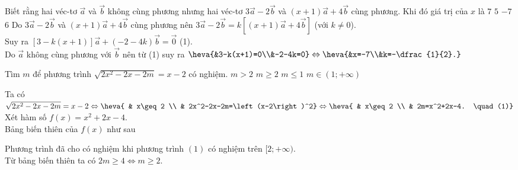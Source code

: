 \begin{ex}%
Biết rằng hai véc-tơ $\overrightarrow{a}$ và $\overrightarrow{b}$ không cùng phương nhưng hai véc-tơ $3\overrightarrow{a}-2\overrightarrow{b}$ và $(x+1)\overrightarrow{a}+4\overrightarrow{b}$ cùng phương. Khi đó giá trị của $x$ là
\choice
{$7$}
{$5$}
{\True $-7$}
{$6$}
\loigiai
{Do $3\overrightarrow{a}-2\overrightarrow{b}$ và $(x+1)\overrightarrow{a}+4\overrightarrow{b}$ cùng phương nên $3\overrightarrow{a}-2\overrightarrow{b}=k[(x+1)\overrightarrow{a}+4\overrightarrow{b}]$ (với $k\ne0$).\\
Suy ra $[3-k(x+1)]\overrightarrow{a}+(-2-4k)\overrightarrow{b}=\overrightarrow{0}$ \quad (1).\\
Do $\overrightarrow{a}$ không cùng phương với $\overrightarrow{b}$ nên từ (1) suy ra $\heva{&3-k(x+1)=0\\&-2-4k=0}\Leftrightarrow\heva{&x=-7\\&k=-\dfrac{1}{2}.}$
}
\end{ex}

\begin{ex}%
Tìm $m$ để phương trình $\sqrt{2x^2-2x-2m}=x-2$ có nghiệm.
\choice
{$m>2$}
{\True $m\ge2$}
{$m\le1$}
{$m\in(1;+\infty)$}
\loigiai
{
Ta có $\sqrt{2x^2-2x-2m}=x-2 \Leftrightarrow \heva{ & x\geq2 \\ & 2x^2-2x-2m=\left(x-2\right)^2} \Leftrightarrow \heva{ & x\geq2 \\ & 2m=x^2+2x-4. \quad (1)}$ \\
Xét hàm số $f(x)=x^2+2x-4$. \\
Bảng biến thiên của $f(x)$ như sau
\begin{center}
\end{center}
Phương trình đã cho có nghiệm khi phương trình $(1)$ có nghiệm trên $[2;+\infty)$. \\
Từ bảng biến thiên ta có $2m\geq4 \Leftrightarrow m\geq2$.
}
\end{ex}

